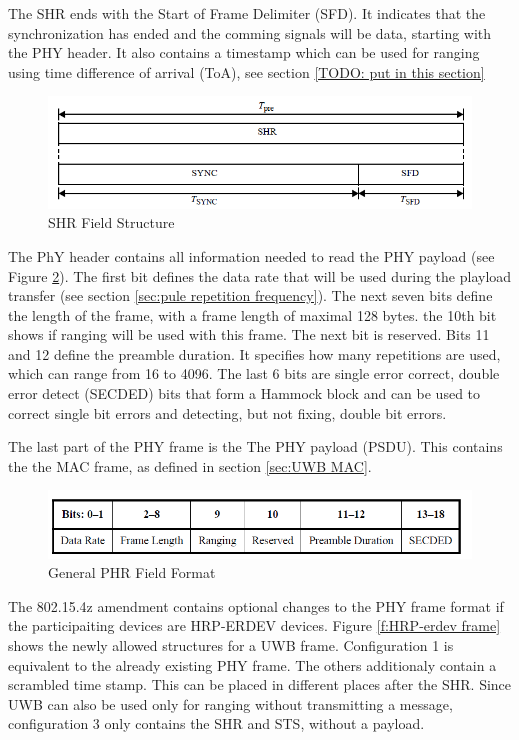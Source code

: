 The SHR ends with the Start of Frame Delimiter (SFD).
It indicates that the synchronization has ended and the comming signals will be data, starting with the PHY header. 
It also contains a timestamp which can be used for ranging using time difference of arrival (ToA), see section \ref{TODO: put in this section}


\begin{figure}[!ht]
\centering
\includegraphics[width=\linewidth]{graphics/SHR_field_structure.png}
\caption{SHR Field Structure \cite{IEEE4-2020-7}}
\label{f:SHR field}
\end{figure}	

The PhY header contains all information needed to read the PHY payload (see Figure \ref{f:PHR general}).
The first bit defines the data rate that will be used during the playload transfer (see section \ref{sec:pule repetition frequency}).
The next seven bits define the length of the frame, with a frame length of maximal 128 bytes.
the 10th bit shows if ranging will be used with this frame.
The next bit is reserved.
Bits 11 and 12 define the preamble duration. It specifies how many repetitions are used, which can range from 16 to 4096.
The last 6 bits are single error correct, double error detect (SECDED) bits that form a Hammock block and can be used to correct single bit errors and detecting, but not fixing, double bit errors.

The last part of the PHY frame is the The PHY payload (PSDU).
This contains the the MAC frame, as defined in section \ref{sec:UWB MAC}.

\begin{figure}[ht!]
\centering
\includegraphics[width=\linewidth]{graphics/PHR_field_format_4.png}
\caption{General PHR Field Format \cite{IEEE4-2020-7}}
\label{f:PHR general}
\end{figure}

The 802.15.4z amendment contains optional changes to the PHY frame format if the participaiting devices are HRP-ERDEV devices.
Figure \ref{f:HRP-erdev frame} shows the newly allowed structures for a UWB frame.
Configuration 1 is equivalent to the already existing PHY frame.
The others additionaly contain a scrambled time stamp.
This can be placed in different places after the SHR.
Since UWB can also be used only for ranging without transmitting a message, configuration 3 only contains the SHR and STS, without a payload.

